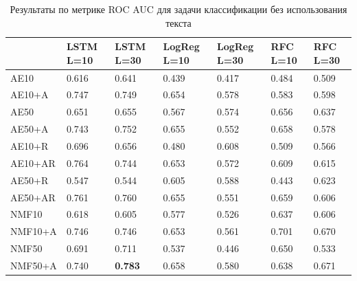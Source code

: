 \begin{table}
\centering
\begin{tabular}{||p{3.8cm}|p{1.5cm}|p{1.5cm}|p{1.5cm}|p{1.5cm}|p{1.5cm}|p{1.5cm}||} 
\hline
& LSTM L=10 & LSTM L=30 & LogReg L=10 & LogReg L=30 & RFC L=10 & RFC L=30\\ \hline\hline
AE10 & 0.616 & 0.641 & 0.439 & 0.417 & 0.484 & 0.509\\ \hline
AE10+A & 0.747 & 0.749 & 0.654 & 0.578 & 0.583 & 0.598\\ \hline
AE50 & 0.651 & 0.655 & 0.567 & 0.574 & 0.656 & 0.637\\ \hline
AE50+A & 0.743 & 0.752 & 0.655 & 0.552 & 0.658 & 0.578\\ \hline
AE10+R & 0.696 & 0.656 & 0.480 & 0.608 & 0.509 & 0.566\\ \hline
AE10+AR & 0.764 & 0.744 & 0.653 & 0.572 & 0.609 & 0.615\\ \hline
AE50+R & 0.547 & 0.544 & 0.605 & 0.588 & 0.443 & 0.623\\ \hline
AE50+AR & 0.761 & 0.760 & 0.655 & 0.551 & 0.659 & 0.606\\ \hline
NMF10 & 0.618 & 0.605 & 0.577 & 0.526 & 0.637 & 0.606\\ \hline
NMF10+A & 0.746 & 0.746 & 0.653 & 0.561 & 0.701 & 0.670\\ \hline
NMF50 & 0.691 & 0.711 & 0.537 & 0.446 & 0.650 & 0.533\\ \hline
NMF50+A & 0.740 & \textbf{0.783} & 0.658 & 0.580 & 0.638 & 0.671\\ \hline
 \end{tabular}

\caption{\label{table:clf-res-text} Результаты по метрике ROC AUC для задачи классификации без использования текста}
\label{table:clf_res-no-text}
\end{table}


